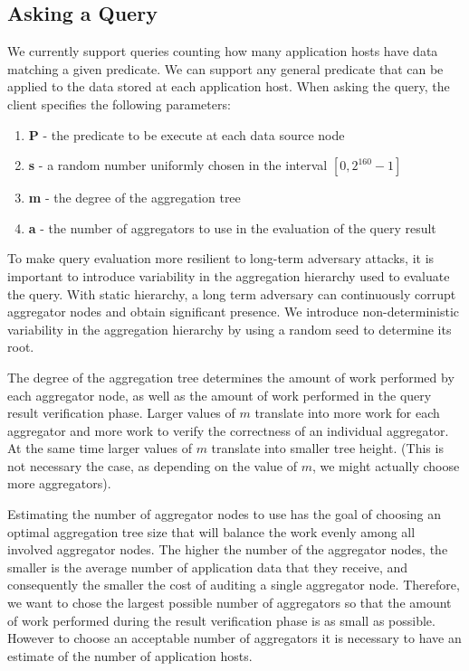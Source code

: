 \documentclass{article}
\begin{document}
\subsection{Asking a Query}
We currently support queries counting
how many application hosts have data matching a given
predicate. We can support any general predicate that can be
applied to the data stored at each application host. When asking the
query, the client specifies the following parameters:
\begin{enumerate}
\item {\bf P} - the predicate to be execute at each data source node
\item {\bf s} - a random number uniformly chosen in the interval
  $[0,2^{160}-1]$ 
\item {\bf m} - the degree of the aggregation tree
\item {\bf a} - the number of aggregators to use in the evaluation of
  the query result
\end{enumerate}

To make query evaluation more resilient to long-term adversary attacks,
it is important to introduce variability in the aggregation hierarchy
used to evaluate the query. With static hierarchy, a long term
adversary can continuously corrupt aggregator nodes and obtain
significant presence. We introduce non-deterministic variability in
the aggregation hierarchy by using a random seed to determine its
root. 

The degree of the aggregation tree determines the amount of work
performed by each aggregator node, as well as the amount of work
performed in the query result verification phase. Larger values of $m$
translate into more work for each aggregator and more work to verify
the correctness of an individual aggregator. At the same time larger
values of $m$ translate into smaller tree height. (This is not
necessary the case, as depending on the value of $m$, we might
actually choose more aggregators).

Estimating the number of aggregator nodes to use has the goal of
choosing an optimal aggregation tree size that will balance the work
evenly among all involved aggregator nodes. The higher the number of
the aggregator nodes, the smaller is the average number of application
data that they receive, and consequently the smaller the cost of
auditing a single aggregator node. Therefore, we want to chose the
largest possible number of aggregators so that the 
amount of work performed during the result verification phase is as small
as possible. However to choose an acceptable number of aggregators it
is necessary to have an estimate of the number of application hosts. 
\end{document}
